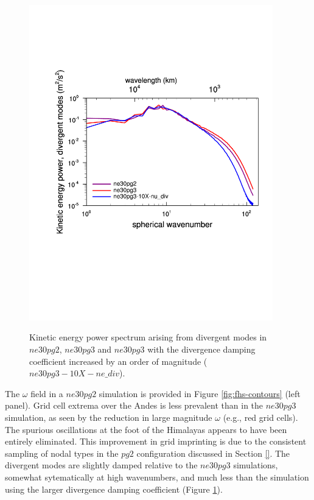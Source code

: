 \documentclass{agujournal}
\begin{document}
\begin{figure}[t]
\begin{center}
\noindent\includegraphics[width=25pc,angle=0]{figs/fhstopo_Divergence_ne30pg2-v-ne30pg3-v-10Xnudiv.pdf}\\
\end{center}
\caption{Kinetic energy power spectrum arising from divergent modes in $ne30pg2$, $ne30pg3$ and $ne30pg3$ with the divergence damping coefficient increased by an order of magnitude ($ne30pg3-10X-ne\_div$).}
\label{fig:fhs-div}
\end{figure}

The $\omega$ field in a $ne30pg2$ simulation is provided in Figure \ref{fig:fhs-contours} (left panel). Grid cell extrema over the Andes is less prevalent than in the $ne30pg3$ simulation, as seen by the reduction in large magnitude $\omega$ (e.g., red grid cells). The spurious oscillations at the foot of the Himalayas appears to have been entirely eliminated. This improvement in grid imprinting is due to the consistent sampling of nodal types in the $pg2$ configuration discussed in Section \ref{}. The divergent modes are slightly damped relative to the $ne30pg3$ simulations, somewhat sytematically at high wavenumbers, and much less than the simulation using the larger divergence damping coefficient (Figure \ref{fig:fhs-div}).  
\end{document}
